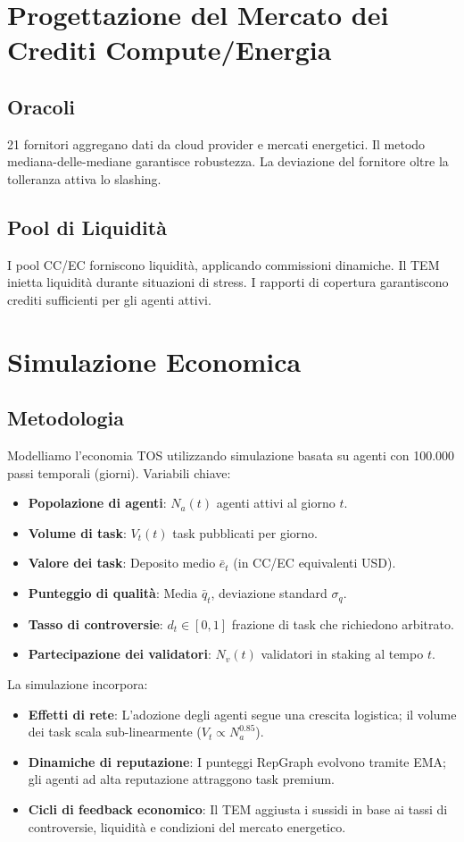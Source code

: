 \documentclass[11pt]{article}
\begin{document}
\begin{itemize}[noitemsep]
\section{Progettazione del Mercato dei Crediti Compute/Energia}
\subsection{Oracoli}
21 fornitori aggregano dati da cloud provider e mercati energetici. Il metodo mediana-delle-mediane garantisce robustezza. La deviazione del fornitore oltre la tolleranza attiva lo slashing.

\subsection{Pool di Liquidità}
I pool CC/EC forniscono liquidità, applicando commissioni dinamiche. Il TEM inietta liquidità durante situazioni di stress. I rapporti di copertura garantiscono crediti sufficienti per gli agenti attivi.

\section{Simulazione Economica}
\label{sec:econ-sim}

\subsection{Metodologia}
Modelliamo l'economia TOS utilizzando simulazione basata su agenti con 100.000 passi temporali (giorni). Variabili chiave:
\begin{itemize}[noitemsep]
  \item \textbf{Popolazione di agenti}: $N_a(t)$ agenti attivi al giorno $t$.
  \item \textbf{Volume di task}: $V_t(t)$ task pubblicati per giorno.
  \item \textbf{Valore dei task}: Deposito medio $\bar{e}_t$ (in CC/EC equivalenti USD).
  \item \textbf{Punteggio di qualità}: Media $\bar{q}_t$, deviazione standard $\sigma_q$.
  \item \textbf{Tasso di controversie}: $d_t \in [0,1]$ frazione di task che richiedono arbitrato.
  \item \textbf{Partecipazione dei validatori}: $N_v(t)$ validatori in staking al tempo $t$.
\end{itemize}
La simulazione incorpora:
\begin{itemize}[noitemsep]
  \item \textbf{Effetti di rete}: L'adozione degli agenti segue una crescita logistica; il volume dei task scala sub-linearmente ($V_t \propto N_a^{0.85}$).
  \item \textbf{Dinamiche di reputazione}: I punteggi RepGraph evolvono tramite EMA; gli agenti ad alta reputazione attraggono task premium.
  \item \textbf{Cicli di feedback economico}: Il TEM aggiusta i sussidi in base ai tassi di controversie, liquidità e condizioni del mercato energetico.
\end{itemize}


\end{itemize}
\end{document}
